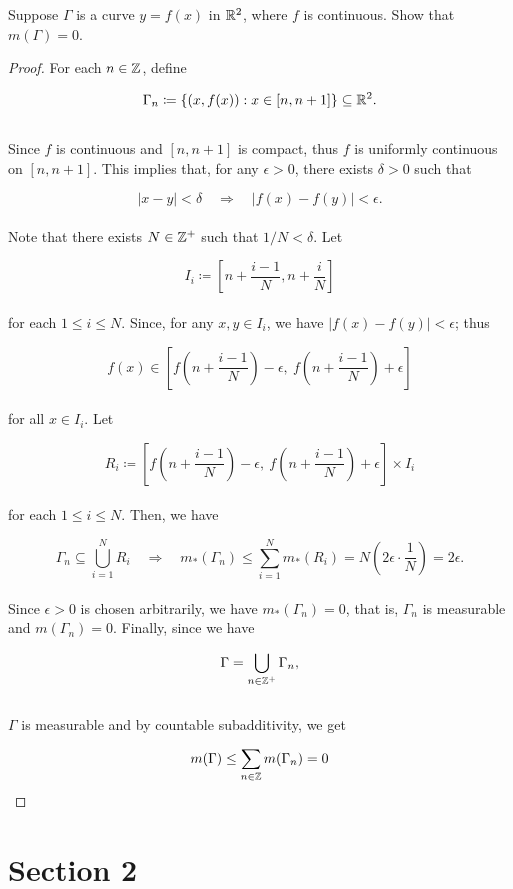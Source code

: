 \documentclass[12pt, a4paper, openany, twoside]{book}
\theoremstyle{definition}
\theoremstyle{remark}
\theoremstyle{plain}
\numberwithin{equation}{section}
\begin{document}
\begin{tcolorbox}[colback=yellow!10!white,colframe=gray!75!black,title=Exercise 1.37]\label{Exercise 1.37}
    Suppose $\Gamma$ is a curve $y=f(x)$ in ${\mathbb {R}}^2$, where $f$ is continuous. Show that $m(\Gamma)=0$. 

\end{tcolorbox}
\begin{proof}
    For each $n\in{\mathbb {Z}}$, define 
    
    \[\Gamma_n\coloneqq\{(x,f(x)): x\in[n,n+1]\}\subseteq{\mathbb {R}}^2.\]
    \\
    Since $f$ is continuous and $[n,n+1]$ is compact, thus $f$ is uniformly continuous on $[n,n+1]$. This implies that, for any $\epsilon>0$, there exists $\delta>0$ such that

    \[|x-y|<\delta\quad\Longrightarrow\quad |f(x)-f(y)|<\epsilon.\]
    \\
    Note that there exists $N\in{\mathbb {Z}}^+$ such that $1/N<\delta$. Let 

    \[I_i\coloneqq\left[n+\frac{i-1}{N},n+\frac{i}{N}\right]\]
    \\
    for each $1\leq i\leq N$. Since, for any $x,y\in I_i$, we have $|f(x)-f(y)|<\epsilon$; thus 

    \[f(x)\in\left[f\left(n+\frac{i-1}{N}\right)-\epsilon,\ f\left(n+\frac{i-1}{N}\right)+\epsilon\right]\]
    \\
    for all $x\in I_i$. Let

    \[R_i\coloneqq \left[f\left(n+\frac{i-1}{N}\right)-\epsilon,\ f\left(n+\frac{i-1}{N}\right)+\epsilon\right]\times I_i\]
    \\
    for each $1\leq i\leq N$. Then, we have

    \[\Gamma_n\subseteq\bigcup_{i=1}^{N}{R_i}\quad\Longrightarrow\quad m_*(\Gamma_n)\leq\sum_{i=1}^{N}{m_*(R_i)}=N\left(2\epsilon\cdot\frac{1}{N}\right)=2\epsilon.\]
    \\
    Since $\epsilon>0$ is chosen arbitrarily, we have $m_*(\Gamma_n)=0$, that is, $\Gamma_n$ is measurable and $m(\Gamma_n)=0$. Finally, since we have

    \[\Gamma=\bigcup_{n\in{\mathbb {Z}}^+}{\Gamma_n},\]
    \\
    $\Gamma$ is measurable and by countable subadditivity, we get 

    \[m(\Gamma)\leq\sum_{n\in{\mathbb {Z}}}{m(\Gamma_n)}=0\]
\end{proof}

\newpage
\section{Section 2}
\end{document}
